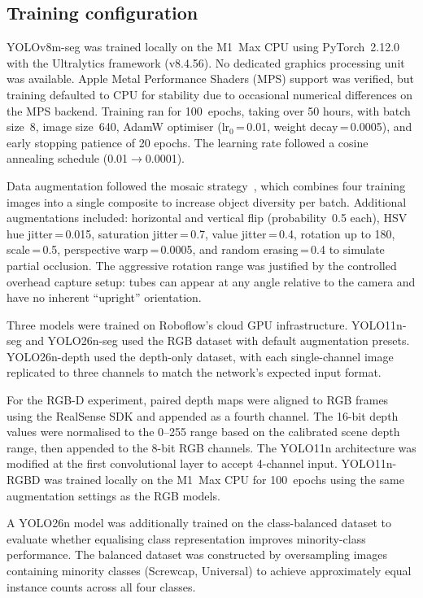 \documentclass{Academic}
\begin{document}
\subsection{Training configuration}

YOLOv8m-seg was trained locally on the M1~Max CPU using PyTorch~2.12.0~\supercite{paszke2019pytorch} with the Ultralytics framework (v8.4.56). No dedicated graphics processing unit was available. Apple Metal Performance Shaders (MPS) support was verified, but training defaulted to CPU for stability due to occasional numerical differences on the MPS backend. Training ran for 100~epochs, taking over 50 hours, with batch size~8, image size~640, AdamW optimiser (lr$_0$\,=\,0.01, weight decay\,=\,0.0005), and early stopping patience of 20 epochs. The learning rate followed a cosine annealing schedule (0.01$\to$0.0001).

Data augmentation followed the mosaic strategy~\supercite{bochkovskiy2020yolov4,shorten2019augmentation}, which combines four training images into a single composite to increase object diversity per batch. Additional augmentations included: horizontal and vertical flip (probability~0.5 each), HSV hue jitter\,=\,0.015, saturation jitter\,=\,0.7, value jitter\,=\,0.4, rotation up to 180\textdegree{}, scale\,=\,0.5, perspective warp\,=\,0.0005, and random erasing\,=\,0.4 to simulate partial occlusion. The aggressive rotation range was justified by the controlled overhead capture setup: tubes can appear at any angle relative to the camera and have no inherent ``upright'' orientation.

Three models were trained on Roboflow's cloud GPU infrastructure. YOLO11n-seg and YOLO26n-seg used the RGB dataset with default augmentation presets. YOLO26n-depth used the depth-only dataset, with each single-channel image replicated to three channels to match the network's expected input format.

For the RGB-D experiment, paired depth maps were aligned to RGB frames using the RealSense SDK and appended as a fourth channel. The 16-bit depth values were normalised to the 0--255 range based on the calibrated scene depth range, then appended to the 8-bit RGB channels. The YOLO11n architecture was modified at the first convolutional layer to accept 4-channel input. YOLO11n-RGBD was trained locally on the M1~Max CPU for 100~epochs using the same augmentation settings as the RGB models.

A YOLO26n model was additionally trained on the class-balanced dataset to evaluate whether equalising class representation improves minority-class performance. The balanced dataset was constructed by oversampling images containing minority classes (Screwcap, Universal) to achieve approximately equal instance counts across all four classes.
\end{document}
